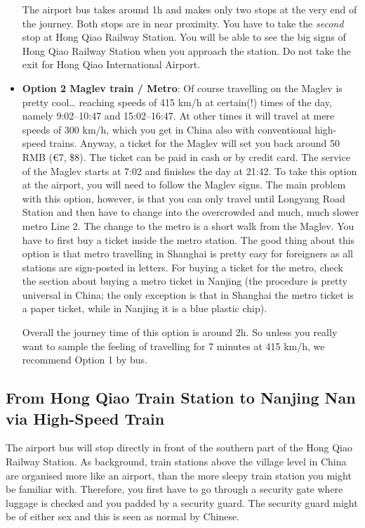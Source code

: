 \documentclass[11pt]{report}
\begin{document}
\begin{itemize}
The airport bus takes around 1h and makes only two stops at
the very end of the journey. Both stops are in near
proximity. You have to take the \emph{second} stop at Hong Qiao
Railway Station. You will be able to see the big signs of
Hong Qiao Railway Station when you approach the station. Do 
not take the exit for Hong Qiao International Airport.

\item \textbf{Option 2 Maglev train / Metro}: 
Of course travelling on the Maglev is pretty cool\ldots{}
reaching speeds of 415 km/h at certain(!) times of the day,
namely 9:02--10:47 and 15:02--16:47. At other times it will
travel at mere speeds of 300 km/h, which you get in China also
with conventional high-speed trains. Anyway, a ticket for the
Maglev will set you back around 50 RMB (\euro{}7, \$8). The
ticket can be paid in cash or by credit card. The service of
the Maglev starts at 7:02 and finishes the day at 21:42. To
take this option at the airport, you will need to follow the
Maglev signs. The main problem with this option, however, is
that you can only travel until Longyang Road Station and then
have to change into the overcrowded and much, much slower
metro Line 2. The change to the metro is a short walk from the
Maglev. You have to first buy a ticket inside the metro
station. The good thing about this option is that metro
travelling in Shanghai is pretty easy for foreigners as all
stations are sign-posted in letters. For buying a ticket for
the metro, check the section about buying a metro ticket in
Nanjing (the procedure is pretty universal in China; the only
exception is that in Shanghai the metro ticket is a paper
ticket, while in Nanjing it is a blue plastic chip).

Overall the journey time of this option is around 2h. So
unless you really want to sample the feeling of travelling for
7 minutes at 415 km/h, we recommend Option 1 by bus.
\end{itemize}

\subsection*{From Hong Qiao Train Station to Nanjing Nan via
High-Speed Train}

The airport bus will stop directly in front of the southern
part of the Hong Qiao Railway Station. As background, train
stations above the village level in China are organised more
like an airport, than the more sleepy train station you might be
familiar with. Therefore, you first have to go through a
security gate where luggage is checked and you padded by a
security guard. The security guard might be of either sex and
this is seen as normal by Chinese. 
\end{document}
